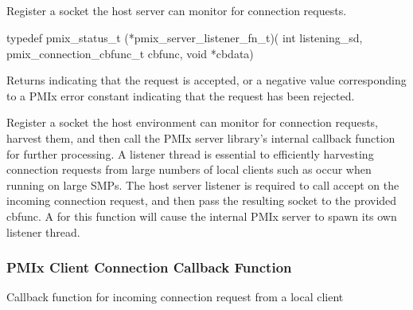 \subsection{}

\summary

Register a socket the host server can monitor for connection requests.

\format

\cspecificstart
\begin{codepar}
typedef pmix_status_t (*pmix_server_listener_fn_t)(
                             int listening_sd,
                             pmix_connection_cbfunc_t cbfunc,
                             void *cbdata)
\end{codepar}
\cspecificend

\begin{arglist}
\end{arglist}

Returns  indicating that the request is accepted, or a negative value corresponding to a PMIx error constant indicating that the request has been rejected.

\descr

Register a socket the host environment can monitor for connection requests, harvest them, and then call the \ac{PMIx} server library's internal callback function for further processing.
A listener thread is essential to efficiently harvesting connection requests from large numbers of local clients such as occur when running on large SMPs.
The host server listener is required to call accept on the incoming connection request, and then pass the resulting socket to the provided cbfunc.
A  for this function will cause the internal \ac{PMIx} server to spawn its own listener thread.

\subsubsection{PMIx Client Connection Callback Function}

\summary

Callback function for incoming connection request from a local client

